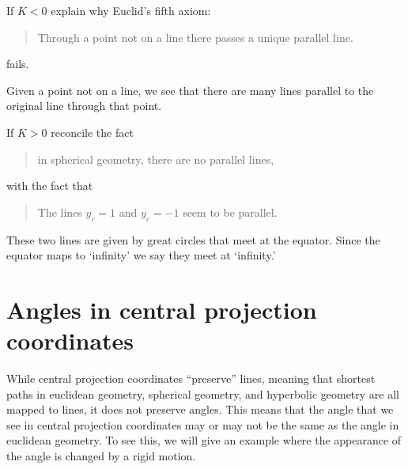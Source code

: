 \documentclass[newpage,hints,handout]{ximera}
\begin{document}
\begin{problem}
  If $K<0$ explain why Euclid's fifth axiom:
  \begin{quote}
    Through a point not on a line there passes a unique parallel line.
  \end{quote}
  fails.
  \begin{freeResponse}
    Given a point not on a line, we see that there are many lines
    parallel to the original line through that point.
  \end{freeResponse}
\end{problem}

\begin{problem}
  If $K>0$ reconcile the fact
  \begin{quote}
    in spherical geometry, there are no parallel lines,
  \end{quote}
  with the fact that 
  \begin{quote}
    The lines $y_c=1$ and $y_c = -1$ seem to be parallel.
  \end{quote}
  \begin{freeResponse}
    These two lines are given by great circles that meet at the
    equator. Since the equator maps to `infinity' we say they meet at
    `infinity.'
  \end{freeResponse}
\end{problem}

\section{Angles in central projection coordinates}

While central projection coordinates ``preserve'' lines, meaning that
shortest paths in euclidean geometry, spherical geometry, and
hyperbolic geometry are all mapped to lines, it does not preserve
angles. This means that the angle that we see in central projection
coordinates may or may not be the same as the angle in euclidean
geometry. To see this, we will give an example where the appearance of
the angle is changed by a rigid motion.
\end{document}
